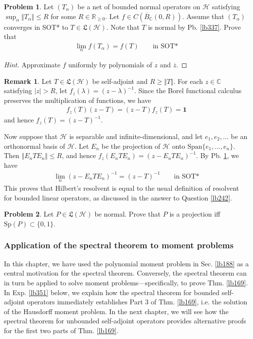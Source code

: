 \documentclass[12pt,b5paper,notitlepage]{article}
\theoremstyle{definition}
\newtheorem{rem}[df]{Remark}
\newtheorem{prob}{\color{red}Problem}[section]
\theoremstyle{plain}
\newcommand{\fk}{\mathfrak}
\newcommand{\ovl}{\overline}
\newcommand{\idt}{\mathbf{1}}
\newcommand{\Span}{\mathrm{Span}}
\newcommand{\Cbb}{\mathbb C}
\newcommand{\Rbb}{\mathbb R}
\newcommand{\Sp}{\mathrm{Sp}}
\newcommand{\MH}{\mathcal H}
\newcommand{\hqed}{\hfill\qedsymbol}
\numberwithin{equation}{section}
\begin{document}
\begin{prob}\label{lb240}
Let $(T_\alpha)$ be a net of bounded normal operators on $\MH$ satisfying $\sup_\alpha\Vert T_\alpha\Vert\leq R$ for some $R\in\Rbb_{\geq0}$. Let $f\in C(\ovl B_\Cbb(0,R))$. Assume that $(T_\alpha)$ converges in SOT* to $T\in\fk L(\MH)$. Note that $T$ is normal by Pb. \ref{lb337}. Prove that
\begin{align}
\lim_\alpha f(T_\alpha)=f(T)\qquad\text{in SOT*}
\end{align}
\end{prob}

\begin{proof}[Hint]
Approximate $f$ uniformly by polynomials of $z$ and $\ovl z$.
\end{proof}

\begin{rem}\label{lb305}
Let $T\in\fk L(\MH)$ be self-adjoint and $R\geq\Vert T\Vert$. For each $z\in\Cbb$ satisfying $|z|>R$, let $f_z(\lambda)=(z-\lambda)^{-1}$. Since the Borel functional calculus preserves the multiplication of functions, we have
\begin{align*}
f_z(T)(z-T)=(z-T)f_z(T)=\idt
\end{align*}
and hence $f_z(T)=(z-T)^{-1}$. 

Now suppose that $\MH$ is separable and infinite-dimensional, and let $e_1,e_2,\dots$ be an orthonormal basis of $\MH$. Let $E_n$ be the projection of $\MH$ onto $\Span\{e_1,\dots,e_n\}$. Then $\Vert E_nTE_n\Vert\leq R$, and hence $f_z(E_nTE_n)=(z-E_nTE_n)^{-1}$. By Pb. \ref{lb240}, we have
\begin{align*}
\lim_n (z-E_nTE_n)^{-1}=(z-T)^{-1}\qquad \text{in SOT*}
\end{align*}
This proves that Hilbert's resolvent is equal to the usual definition of resolvent for bounded linear operators, as discussed in the answer to Question \ref{lb242}.  \hqed
\end{rem}

\begin{prob}
Let $P\in\fk L(\MH)$ be normal. Prove that $P$ is a projection iff $\Sp(P)\subset\{0,1\}$.
\end{prob}


\subsubsection{Application of the spectral theorem to moment problems}


In this chapter, we have used the polynomial moment problem in Sec. \ref{lb188} as a central motivation for the spectral theorem. Conversely, the spectral theorem can in turn be applied to solve moment problems---specifically, to prove Thm. \ref{lb169}. In Exp. \ref{lb351} below, we explain how the spectral theorem for bounded self-adjoint operators immediately establishes Part 3 of Thm. \ref{lb169}, i.e. the solution of the Hausdorff moment problem. In the next chapter, we will see how the spectral theorem for unbounded self-adjoint operators provides alternative proofs for the first two parts of Thm. \ref{lb169}.
\end{document}
